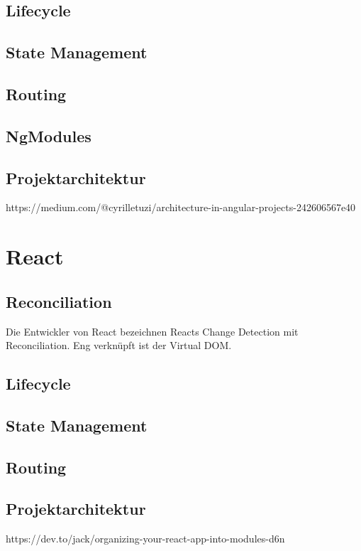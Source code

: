 \subsection{Lifecycle}
\subsection{State Management}
\subsection{Routing}
\subsection{NgModules} %
\subsection{Projektarchitektur}
https://medium.com/@cyrilletuzi/architecture-in-angular-projects-242606567e40

\section{React}

\subsection{Reconciliation}
Die Entwickler von React bezeichnen Reacts Change Detection mit Reconciliation. Eng verknüpft ist der Virtual DOM.
\subsection{Lifecycle}
\subsection{State Management}
\subsection{Routing}
\subsection{Projektarchitektur}
https://dev.to/jack/organizing-your-react-app-into-modules-d6n
